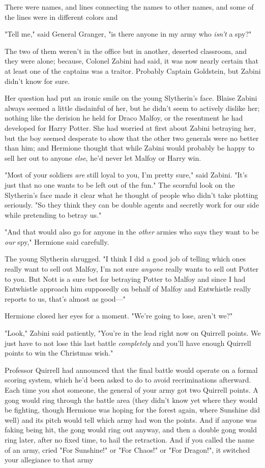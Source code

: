 There were names, and lines connecting the names to other names, and some of
the lines were in different colors and{\el}

"Tell me," said General Granger, "is there anyone in my army who \emph{isn't} a
spy?"

The two of them weren't in the office but in another, deserted classroom, and
they were alone; because, Colonel Zabini had said, it was now nearly certain
that at least one of the captains was a traitor. Probably Captain Goldstein,
but Zabini didn't know for sure.

Her question had put an ironic smile on the young Slytherin's face. Blaise
Zabini always seemed a little disdainful of her, but he didn't seem to actively
dislike her; nothing like the derision he held for Draco Malfoy, or the
resentment he had developed for Harry Potter. She had worried at first about
Zabini betraying her, but the boy seemed desperate to show that the other two
generals were no better than him; and Hermione thought that while Zabini would
probably be happy to sell her out to anyone \emph{else}, he'd never let Malfoy
or Harry win.

"Most of your soldiers \emph{are} still loyal to you, I'm pretty sure," said
Zabini. "It's just that no one wants to be left out of the fun." The scornful
look on the Slytherin's face made it clear what he thought of people who didn't
take plotting seriously. "So they think they can be double agents and secretly
work for our side while pretending to betray us."

"And that would also go for anyone in the \emph{other} armies who says they
want to be \emph{our} spy," Hermione said carefully.

The young Slytherin shrugged. "I think I did a good job of telling which ones
really want to sell out Malfoy, I'm not sure \emph{anyone} really wants to sell
out Potter to you. But Nott is a sure bet for betraying Potter to Malfoy and
since I had Entwhistle approach him supposedly on behalf of Malfoy and
Entwhistle really reports to us, that's almost as good---"

Hermione closed her eyes for a moment. "We're going to lose, aren't we?"

"Look," Zabini said patiently, "You're in the lead right now on Quirrell
points. We just have to not lose this last battle \emph{completely} and you'll
have enough Quirrell points to win the Christmas wish."

Professor Quirrell had announced that the final battle would operate on a
formal scoring system, which he'd been asked to do to avoid recriminations
afterward. Each time you shot someone, the general of your army got two
Quirrell points. A gong would ring through the battle area (they didn't know
yet where they would be fighting, though Hermione was hoping for the forest
again, where Sunshine did well) and its pitch would tell which army had won the
points. And if anyone was faking being hit, the gong would ring out anyway, and
then a double gong would ring later, after no fixed time, to hail the
retraction. And if you called the name of an army, cried "For Sunshine!" or
"For Chaos!" or "For Dragon!", it switched your allegiance to that army{\el}

